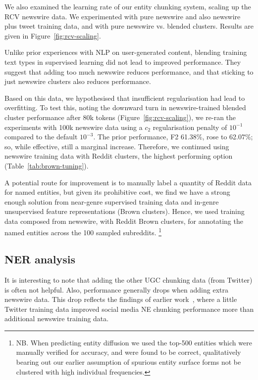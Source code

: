 \documentclass[10pt,journal,compsoc]{IEEEtran}
\begin{document}
We also examined the learning rate of our entity chunking system, scaling up the RCV newswire data.
We experimented with pure newswire and also newswire plus tweet training data, and with pure newswire vs. blended clusters.
Results are given in Figure~\ref{fig:rcv-scaling}.

Unlike prior experiences with NLP on user-generated content, blending training text types in supervised learning did not lead to improved performance.
They suggest that adding too much newswire reduces performance, and that sticking to just newswire clusters also reduces performance.

Based on this data, we hypothesised that insufficient regularisation had lead to overfitting.
To test this, noting the downward turn in newswire-trained blended cluster performance after 80k tokens (Figure~\ref{fig:rcv-scaling}), we re-ran the experiments with 100k newswire data using a $c_2$ regularisation penalty of $10^{-1}$ compared to the default $10^{-3}$.
The prior performance, F2 61.38\%, rose to 62.07\%; so, while effective, still a marginal increase.
Therefore, we continued using newswire training data with Reddit clusters, the highest performing option (Table~\ref{tab:brown-tuning}).

A potential route for improvement is to manually label a quantity of Reddit data for named entities, but given its prohibitive cost, we find we have a strong enough solution from near-genre supervised training data and in-genre unsupervised feature representations (Brown clusters).
Hence, we used training data composed from newswire, with Reddit Brown clusters, for annotating the named entities across the 100 sampled subreddits.
\footnote{NB. When predicting entity diffusion we used the top-500 entities which were manually verified for accuracy, and were found to be correct, qualitatively bearing out our earlier assumption of spurious entity surface forms not be clustered with high individual frequencies.}




\subsection{NER analysis}%

It is interesting to note that adding the other UGC chunking data (from Twitter) is often not helpful.
Also, performance generally drops when adding extra newswire data.
This drop reflects the findings of earlier work~\cite{ritter2011named}, where a little Twitter training data improved social media NE chunking performance more than additional newswire training data.
\end{document}
